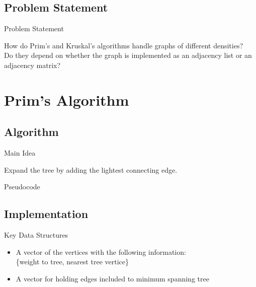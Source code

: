 \documentclass{beamer}
\begin{document}
\subsection{Problem Statement}
\begin{frame}{Problem Statement}
    \begin{center}
    How do Prim's and Kruskal's algorithms handle graphs of different
    densities?\\
    \bigskip
    Do they depend on whether the graph is implemented as an 
    adjacency list or an adjacency matrix?
    \end{center}
\end{frame}


\section{Prim's Algorithm}\frame{\sectionpage}
\subsection{Algorithm}
\begin{frame}{Main Idea}
    \begin{center}
    Expand the tree by adding the lightest connecting edge.
    \end{center}
\end{frame}

\begin{frame}{Pseudocode}
\vprim
\end{frame}

\subsection{Implementation}
\begin{frame}{Key Data Structures}
    \begin{itemize}
    \item A vector of the vertices with the following information:\\
        \{weight to tree, nearest tree vertice\}
    \item A vector for holding edges included to minimum spanning tree
    \end{itemize}
\end{frame}
\end{document}
